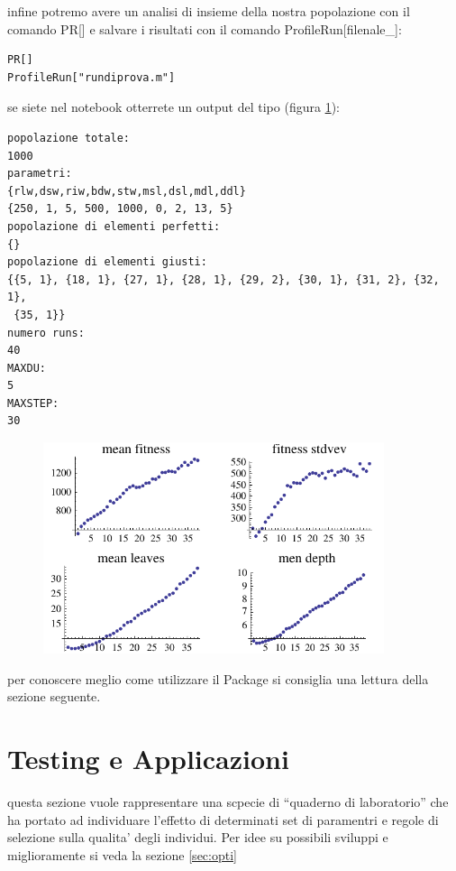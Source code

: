 \documentclass[12pt, a4paper]{article}
\begin{document}
infine potremo avere un analisi di insieme della nostra popolazione con il comando PR[] e salvare i risultati con il comando ProfileRun[filenale\_]:
\begin{lstlisting}
PR[]
ProfileRun["rundiprova.m"]
\end{lstlisting}

se siete nel notebook otterrete un output del tipo (figura \ref{figure:tryout}):
\begin{lstlisting}
popolazione totale:
1000
parametri:
{rlw,dsw,riw,bdw,stw,msl,dsl,mdl,ddl}
{250, 1, 5, 500, 1000, 0, 2, 13, 5}
popolazione di elementi perfetti: 
{}
popolazione di elementi giusti: 
{{5, 1}, {18, 1}, {27, 1}, {28, 1}, {29, 2}, {30, 1}, {31, 2}, {32, 1}, 
 {35, 1}}
numero runs:
40
MAXDU:
5
MAXSTEP:
30
\end{lstlisting}

\begin{figure}[!h]
\begin{center}
\includegraphics[width=10.0cm]{pr.pdf}
\label{figure:tryout}
\end{center}
\end{figure}

per conoscere meglio come utilizzare il Package si consiglia una lettura della sezione seguente.





\section{Testing e Applicazioni}
\label{sec:exp}
questa sezione vuole rappresentare una scpecie di ``quaderno di laboratorio'' che ha portato ad individuare l'effetto di determinati set di paramentri e regole di selezione sulla qualita' degli individui.
Per idee su possibili sviluppi e miglioramente si veda la sezione \ref{sec:opti}
\end{document}
